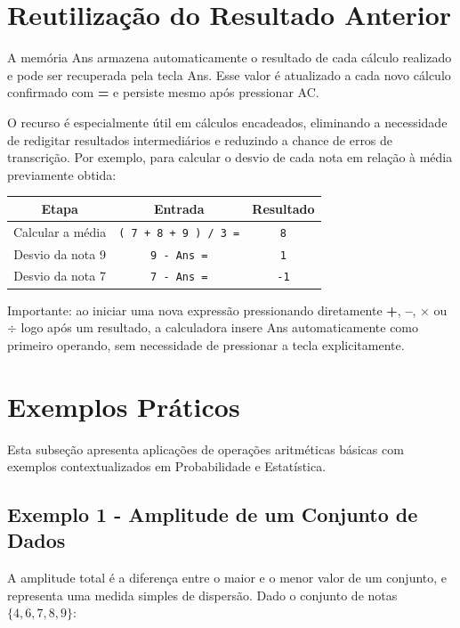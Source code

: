 \section{Reutilização do Resultado Anterior}

A memória Ans armazena automaticamente o resultado de cada cálculo realizado e pode ser recuperada pela tecla Ans. Esse valor é atualizado a cada novo cálculo confirmado com \textbf{=} e persiste mesmo após pressionar AC.

O recurso é especialmente útil em cálculos encadeados, eliminando a necessidade de redigitar resultados intermediários e reduzindo a chance de erros de transcrição. Por exemplo, para calcular o desvio de cada nota em relação à média previamente obtida:

\begin{center}
\begin{tabular}{|c|c|c|}
    \hline
    \textbf{Etapa} & \textbf{Entrada} & \textbf{Resultado} \\
    \hline
    Calcular a média & \texttt{( 7 + 8 + 9 ) / 3 =} & \texttt{8} \\
    Desvio da nota 9 & \texttt{9 - Ans =} & \texttt{1} \\
    Desvio da nota 7 & \texttt{7 - Ans =} & \texttt{-1} \\
    \hline
\end{tabular}
\end{center}

Importante: ao iniciar uma nova expressão pressionando diretamente \textbf{+}, \textbf{--}, \textbf{$\times$} ou \textbf{$\div$} logo após um resultado, a calculadora insere Ans automaticamente como primeiro operando, sem necessidade de pressionar a tecla explicitamente.

\section{Exemplos Práticos}

Esta subseção apresenta aplicações de operações aritméticas básicas com exemplos contextualizados em Probabilidade e Estatística.

\subsection*{Exemplo 1 - Amplitude de um Conjunto de Dados}

A amplitude total é a diferença entre o maior e o menor valor de um conjunto, e representa uma medida simples de dispersão. Dado o conjunto de notas $\{4, 6, 7, 8, 9\}$:

